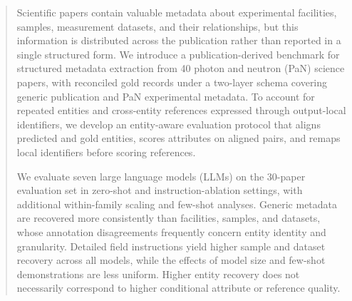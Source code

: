 \begin{abstract}
Scientific papers contain valuable metadata about experimental facilities,
samples, measurement datasets, and their relationships, but this information
is distributed across the publication rather than reported in a single
structured form. We introduce a publication-derived benchmark for structured
metadata extraction from 40 photon and neutron (PaN) science papers, with
reconciled gold records under a two-layer schema covering generic
publication and PaN experimental metadata. To account for repeated entities
and cross-entity references expressed through output-local identifiers, 
we develop an entity-aware evaluation protocol that aligns predicted and 
gold entities, scores attributes on aligned pairs, and remaps local identifiers 
before scoring references.

We evaluate seven large language models (LLMs) on the 30-paper evaluation set in
zero-shot and instruction-ablation settings, with additional within-family scaling and
few-shot analyses. Generic metadata are recovered more consistently than
facilities, samples, and datasets, whose annotation disagreements frequently
concern entity identity and granularity. Detailed field instructions yield higher 
sample and dataset recovery across all models, while the effects of model size 
and few-shot demonstrations are less uniform. Higher entity recovery does not 
necessarily correspond to higher conditional attribute or reference quality.
\end{abstract}
